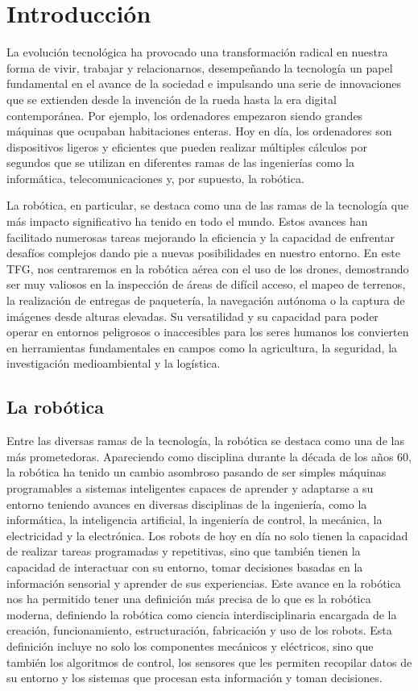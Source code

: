\chapter{Introducción}
\label{cap:introduccion}
\setcounter{page}{1}

La evolución tecnológica ha provocado una transformación radical en nuestra forma de vivir, trabajar y relacionarnos, desempeñando la tecnología un papel 
fundamental en el avance de la sociedad e impulsando una serie de innovaciones que se extienden desde la invención de la rueda hasta la era digital contemporánea. 
Por ejemplo, los ordenadores empezaron siendo grandes máquinas que ocupaban habitaciones enteras. Hoy en día, los ordenadores
son dispositivos ligeros y eficientes que pueden realizar múltiples cálculos por segundos que se utilizan en diferentes ramas de las ingenierías como la informática, telecomunicaciones y,
por supuesto, la robótica.

La robótica, en particular, se destaca como una de las ramas de la tecnología que más impacto significativo ha tenido en todo el mundo. Estos avances han facilitado numerosas tareas mejorando la eficiencia 
y la capacidad de enfrentar desafíos complejos dando pie a nuevas posibilidades en nuestro entorno. En este TFG, nos centraremos en la robótica aérea con el uso de los drones, 
demostrando ser muy valiosos en la inspección de áreas de difícil acceso, el mapeo de terrenos, la realización de entregas de paquetería, la navegación autónoma o la captura 
de imágenes desde alturas elevadas. Su versatilidad y su capacidad para poder operar en entornos peligrosos o inaccesibles para los seres humanos los convierten 
en herramientas fundamentales en campos como la agricultura, la seguridad, la investigación medioambiental y la logística. 

\section{La robótica}
\label{sec:enfoquesrobotica}
Entre las diversas ramas de la tecnología, la robótica se destaca como una de las más prometedoras. Apareciendo como disciplina durante la década de los años 60, 
la robótica ha tenido un cambio asombroso  pasando de ser simples máquinas programables a sistemas inteligentes capaces de aprender y adaptarse 
a su entorno teniendo avances en diversas disciplinas de la ingeniería, como la informática, la inteligencia artificial, la ingeniería de control, la mecánica, 
la electricidad y la electrónica. 
Los robots de hoy en día no solo tienen la capacidad de realizar tareas programadas y repetitivas, sino que también tienen la capacidad de interactuar con su entorno, 
tomar decisiones basadas en la información sensorial y aprender de sus experiencias. Este avance en la robótica nos ha permitido tener una definición más precisa de lo que es 
la robótica moderna, definiendo la robótica como ciencia interdisciplinaria encargada de la creación, funcionamiento, estructuración, fabricación y uso de los robots. 
Esta definición incluye no solo los componentes mecánicos y eléctricos, sino que también los algoritmos de control, los sensores que les permiten recopilar
datos de su entorno y los sistemas que procesan esta información y toman decisiones.

